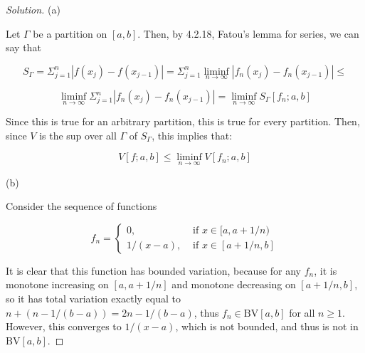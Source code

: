 \documentclass[10pt]{article}
\newcommand{\bv}{{\text{BV}}}
\begin{document}
\begin{proof}[Solution]

(a)

Let $\Gamma$ be a partition on $[a,b]$. Then, by 4.2.18, Fatou's lemma for series, we can say that 

$$S_\Gamma = \Sigma_{j=1}^n | f(x_j) - f(x_{j-1}) | =  \Sigma_{j=1}^n \liminf_{n \to \infty} | f_n(x_j) - f_n(x_{j-1}) | \leq $$

$$ \liminf_{n \to \infty}\Sigma_{j=1}^n | f_n(x_j) - f_n(x_{j-1}) | = \liminf_{n \to \infty} S_\Gamma[f_n; a,b]$$

Since this is true for an arbitrary partition, this is true for every partition. Then, since $V$ is the sup over all $\Gamma$ of $S_\Gamma$, this implies that:

$$ V[f;a,b] \leq \liminf_{n \to \infty} V[f_n; a,b]$$

(b)

Consider the sequence of functions 

$$f_n = \begin{cases} 0, & \text{ if } x \in [a,a+1/n) \\ 1/(x-a), & \text{ if  } x \in [a+1/n,b] \end{cases}$$

It is clear that this function has bounded variation, because for any $f_n$, it is monotone increasing on $[a,a+1/n]$ and monotone decreasing on $[a+1/n,b]$, so it has total variation exactly equal to $n + (n-1/(b-a)) = 2n-1/(b-a)$, thus $f_n \in \bv[a,b]$ for all $n \geq 1$. However, this converges to $1/(x-a)$, which is not bounded, and thus is not in $\bv[a,b]$.

\end{proof}
\end{document}

